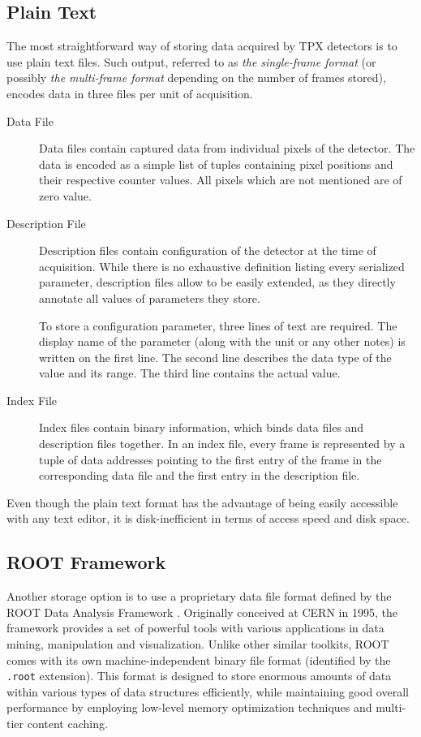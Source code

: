 \subsection{Plain Text}
The most straightforward way of storing data acquired by TPX detectors is to use plain text files. Such output, referred to as \textit{the single-frame format} (or possibly \textit{the multi-frame format} depending on the number of frames stored), encodes data in three files per unit of acquisition.

\begin{description}
	\item[Data File]
	Data files contain captured data from individual pixels of the detector. The data is encoded as a simple list of tuples containing pixel positions and their respective counter values. All pixels which are not mentioned are of zero value.

	\item[Description File]
	Description files contain configuration of the detector at the time of acquisition. While there is no exhaustive definition listing every serialized parameter, description files allow to be easily extended, as they directly annotate all values of parameters they store.

	To store a configuration parameter, three lines of text are required. The display name of the parameter (along with the unit or any other notes) is written on the first line. The second line describes the data type of the value and its range. The third line contains the actual value.

	\item[Index File]
	Index files contain binary information, which binds data files and description files together. In an index file, every frame is represented by a tuple of data addresses pointing to the first entry of the frame in the corresponding data file and the first entry in the description file.
\end{description}

Even though the plain text format has the advantage of being easily accessible with any text editor, it is disk-inefficient in terms of access speed and disk space.

\subsection{ROOT Framework}
\label{storage:ROOT}
Another storage option is to use a proprietary data file format defined by the ROOT Data Analysis Framework \cite{Brun199781}. Originally conceived at CERN in 1995, the framework provides a set of powerful tools with various applications in data mining, manipulation and visualization. Unlike other similar toolkits, ROOT comes with its own machine-independent binary file format (identified by the \texttt{.root} extension). This format is designed to store enormous amounts of data within various types of data structures efficiently, while maintaining good overall performance by employing low-level memory optimization techniques and multi-tier content caching.

